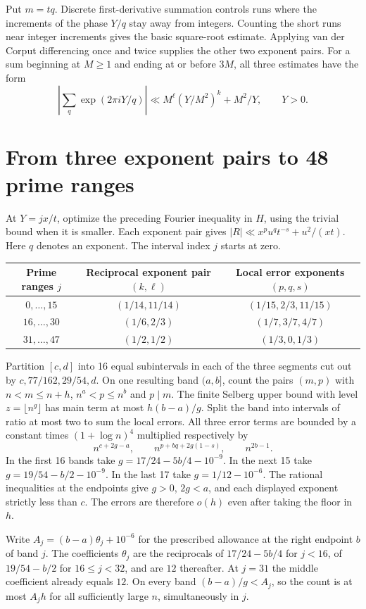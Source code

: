 \documentclass[10pt]{article}
\begin{document}
Put $m=tq$. Discrete first-derivative summation controls runs where the increments of the phase $Y/q$ stay away from integers. Counting the short runs near integer increments gives the basic square-root estimate. Applying van der Corput differencing once and twice supplies the other two exponent pairs. For a sum beginning at $M\ge1$ and ending at or before $3M$, all three estimates have the form
\[
 \left|\sum_q \exp(2\pi iY/q)\right|\ll M^\ell(Y/M^2)^k+M^2/Y,\qquad Y>0 .
\]

\newpage
\section*{From three exponent pairs to 48 prime ranges}
At $Y=jx/t$, optimize the preceding Fourier inequality in $H$, using the trivial bound when it is smaller. Each exponent pair gives
$|R|\ll x^p u^q t^{-s}+u^2/(xt)$. Here $q$ denotes an exponent. The interval index $j$ starts at zero.
\begin{center}
\renewcommand{\arraystretch}{1.3}
\begin{tabular}{c|c|c}
Prime ranges $j$ & Reciprocal exponent pair $(k,\ell)$ & Local error exponents $(p,q,s)$\\ \hline
$0,\ldots,15$ & $(1/14,11/14)$ & $(1/15,2/3,11/15)$\\
$16,\ldots,30$ & $(1/6,2/3)$ & $(1/7,3/7,4/7)$\\
$31,\ldots,47$ & $(1/2,1/2)$ & $(1/3,0,1/3)$
\end{tabular}
\end{center}
Partition $[c,d]$ into 16 equal subintervals in each of the three segments cut out by $c,77/162,29/54,d$. On one resulting band $(a,b]$, count the pairs $(m,p)$ with $n<m\le n+h$, $n^a<p\le n^b$ and $p\mid m$. The finite Selberg upper bound with level $z=\lfloor n^g\rfloor$ has main term at most $h(b-a)/g$. Split the band into intervals of ratio at most two to sum the local errors. All three error terms are bounded by a constant times $(1+\log n)^4$ multiplied respectively by
\[
 n^{c+2g-a},\qquad n^{p+bq+2g(1-s)},\qquad n^{2b-1}.
\]
In the first 16 bands take $g=17/24-5b/4-10^{-9}$. In the next 15 take $g=19/54-b/2-10^{-9}$. In the last 17 take $g=1/12-10^{-6}$. The rational inequalities at the endpoints give $g>0$, $2g<a$, and each displayed exponent strictly less than $c$. The errors are therefore $o(h)$ even after taking the floor in $h$.

Write $A_j=(b-a)\theta_j+10^{-6}$ for the prescribed allowance at the right endpoint $b$ of band $j$. The coefficients $\theta_j$ are the reciprocals of $17/24-5b/4$ for $j<16$, of $19/54-b/2$ for $16\le j<32$, and are $12$ thereafter. At $j=31$ the middle coefficient already equals $12$. On every band $(b-a)/g<A_j$, so the count is at most $A_j h$ for all sufficiently large $n$, simultaneously in $j$.
\end{document}
